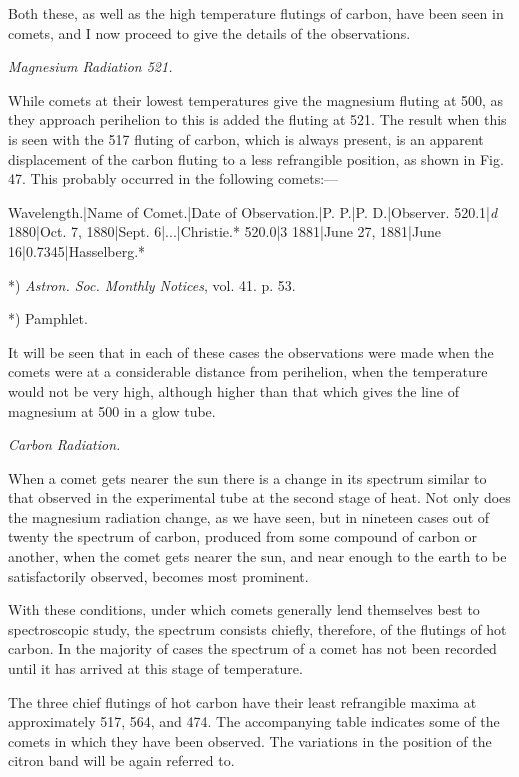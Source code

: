 \documentclass[a4paper, 12pt, oneside, polutonikogreek, english]{article}
\begin{document}
Both these, as well as the high temperature flutings of carbon, have been seen in comets, and I now proceed to give the details of the observations.

\emph{Magnesium Radiation 521.}

While comets at their lowest temperatures give the magnesium fluting at 500, as they approach perihelion to this is added the fluting at 521. The result when this is seen with the 517 fluting of carbon, which is always present, is an apparent displacement of the carbon fluting to a less refrangible position, as shown in Fig. 47. This probably occurred in the following comets:---

Wavelength.|Name of Comet.|Date of Observation.|P. P.|P. D.|Observer. 
520.1|\emph{d} 1880|Oct. 7, 1880|Sept. 6|...|Christie.* 
520.0|3 1881|June 27, 1881|June 16|0.7345|Hasselberg.*

*) \emph{Astron. Soc. Monthly Notices}, vol. 41. p. 53.

*) Pamphlet.

It will be seen that in each of these cases the observations were made when the comets were at a considerable distance from perihelion, when the temperature would not be very high, although higher than that which gives the line of magnesium at 500 in a glow tube.

\emph{Carbon Radiation.}

When a comet gets nearer the sun there is a change in its spectrum similar to that observed in the experimental tube at the second stage of heat. Not only does the magnesium radiation change, as we have seen, but in nineteen cases out of twenty the spectrum of carbon, produced from some compound of carbon or another, when the comet gets nearer the sun, and near enough to the earth to be satisfactorily observed, becomes most prominent.

With these conditions, under which comets generally lend themselves best to spectroscopic study, the spectrum consists chiefly, therefore, of the flutings of hot carbon. In the majority of cases the spectrum of a comet has not been recorded until it has arrived at this stage of temperature.

The three chief flutings of hot carbon have their least refrangible maxima at approximately 517, 564, and 474. The accompanying table indicates some of the comets in which they have been observed. The variations in the position of the citron band will be again referred to.
\end{document}
